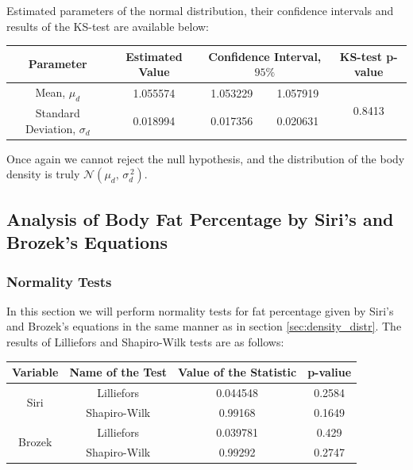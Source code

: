 \documentclass[11pt,american,american]{article}
\begin{document}
\medskip

Estimated parameters of the normal distribution, their confidence intervals and results of the KS-test are available below:

\begin{table}[ht!]
	\centering
	\begin{tabular}{|c||c||c|c||c|}
		\hline 
		Parameter &  Estimated Value & \multicolumn{2}{c||}{Confidence Interval, $95\%$}  & KS-test p-value \\ 
		\hline \hline 
		Mean, $\mu_{d}$ & 1.055574 & 1.053229 &  1.057919 & \multirow{2}{*}{0.8413} \\ 
		\cline{1-4}
		Standard Deviation, $\sigma_{d}$ & 0.018994 & 0.017356 &  0.020631 & \\ 
		\hline
	\end{tabular} 
\end{table}

Once again we cannot reject the null hypothesis, and the distribution of the body density is truly $\mathcal{N} (\mu_{d},\,\sigma^{\,2}_{d})$.

\subsection{Analysis of Body Fat Percentage by Siri's and Brozek's Equations}

\subsubsection{Normality Tests}

In this section we will perform normality tests for fat percentage given by Siri's and Brozek's equations in the same manner as in section \ref{sec:density_distr}. The results of Lilliefors and Shapiro-Wilk tests are as follows:

\begin{table}[ht!]
	\centering
	\begin{tabular}{|c||c||c|c|}
		\hline 
		Variable & Name of the Test & Value of the Statistic & p-valiue \\ 
		\hline \hline
		\multirow{2}{*}{Siri} & Lilliefors & 0.044548 & 0.2584 \\ 
		\cline{2-4} 
		 & Shapiro-Wilk & 0.99168 & 0.1649 \\ 
		\hline \hline
		\multirow{2}{*}{Brozek} & Lilliefors & 0.039781 & 0.429 \\ 
		\cline{2-4} 
		& Shapiro-Wilk & 0.99292 & 0.2747 \\ 
		\hline
	\end{tabular} 
\end{table}
\end{document}
